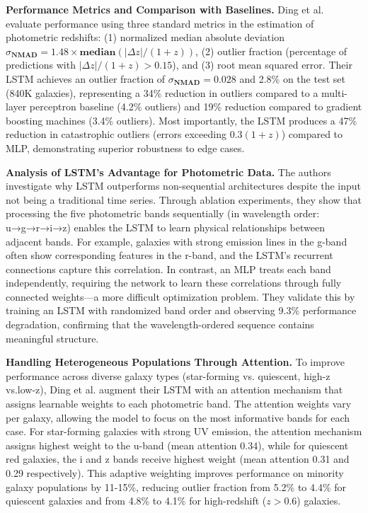 \documentclass[letterpaper]{article} %
\begin{document}
\textbf{Performance Metrics and Comparison with Baselines.} Ding et al. evaluate performance using three standard metrics in the estimation of photometric redshifts: (1) normalized median absolute deviation $\sigma_
\textbf{NMAD} = 1.48 \times
\textbf{median}(|\Delta z|/(1+z))$, (2) outlier fraction (percentage of predictions with $|\Delta z|/(1+z) > 0.15$), and (3) root mean squared error. Their LSTM achieves an outlier fraction of $\sigma_
\textbf{NMAD} = 0.028$ and 2.8\% on the test set (840K galaxies), representing a 34\% reduction in outliers compared to a multi-layer perceptron baseline (4.2\% outliers) and 19\% reduction compared to gradient boosting machines (3.4\% outliers). Most importantly, the LSTM produces a 47\% reduction in catastrophic outliers (errors exceeding $0.3(1+z)$) compared to MLP, demonstrating superior robustness to edge cases.

\textbf{Analysis of LSTM's Advantage for Photometric Data.} The authors investigate why LSTM outperforms non-sequential architectures despite the input not being a traditional time series. Through ablation experiments, they show that processing the five photometric bands sequentially (in wavelength order: u→g→r→i→z) enables the LSTM to learn physical relationships between adjacent bands. For example, galaxies with strong emission lines in the g-band often show corresponding features in the r-band, and the LSTM's recurrent connections capture this correlation. In contrast, an MLP treats each band independently, requiring the network to learn these correlations through fully connected weights—a more difficult optimization problem. They validate this by training an LSTM with randomized band order and observing 9.3\% performance degradation, confirming that the wavelength-ordered sequence contains meaningful structure.

\textbf{Handling Heterogeneous Populations Through Attention.} To improve performance across diverse galaxy types (star-forming vs. quiescent, high-z vs.low-z), Ding et al. augment their LSTM with an attention mechanism that assigns learnable weights to each photometric band. The attention weights vary per galaxy, allowing the model to focus on the most informative bands for each case. For star-forming galaxies with strong UV emission, the attention mechanism assigns highest weight to the u-band (mean attention 0.34), while for quiescent red galaxies, the i and z bands receive highest weight (mean attention 0.31 and 0.29 respectively). This adaptive weighting improves performance on minority galaxy populations by 11-15\%, reducing outlier fraction from 5.2\% to 4.4\% for quiescent galaxies and from 4.8\% to 4.1\% for high-redshift ($z > 0.6$) galaxies.
\end{document}
